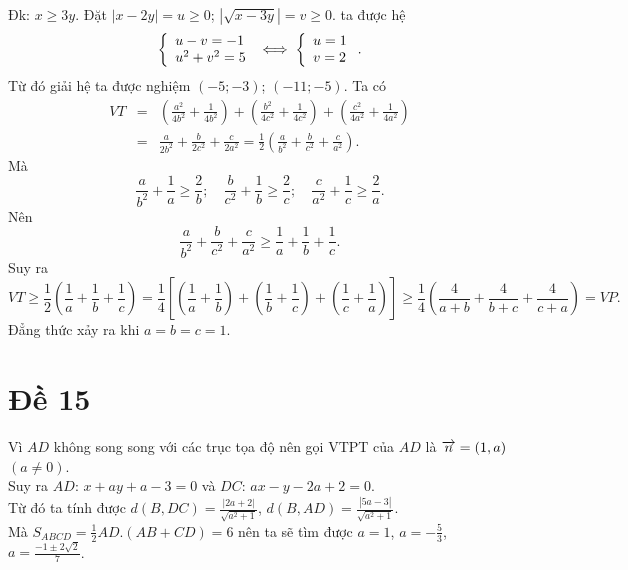 \hda 
Đk: $x\ge 3y$. Đặt $|x-2y|=u\ge 0$; $|\sqrt{x-3y}|=v\ge 0$. ta được hệ
$$ \left\{ \begin{array}{l} u-v=-1\\ u^2+v^2=5 \end{array}\right.\iff  \left\{ \begin{array}{l} u=1\\v=2 \end{array}\right.. $$
Từ đó giải hệ ta được nghiệm $(-5;-3)$; $(-11;-5)$.
\hda 
Ta có
\begin{eqnarray*}
VT&=&\left(\frac{a^2}{4b^2}+\frac 1{4b^2}\right)+\left(\frac{b^2}{4c^2}+\frac{1}{4c^2}\right)+\left(\frac{c^2}{4a^2}+\frac{1}{4a^2}\right)\\ 
&=&\frac{a}{2b^2}+\frac{b}{2c^2}+\frac{c}{2a^2}=\frac 12\left(\frac a{b^2}+\frac b{c^2}+\frac{c}{a^2}\right). 
\end{eqnarray*}
Mà
$$ \frac{a}{b^2}+\frac 1a\ge\frac 2b;\quad \frac{b}{c^2}+\frac 1b\ge \frac 2c;\quad \frac{c}{a^2}+\frac 1c\ge \frac 2a. $$
Nên
$$ \frac{a}{b^2}+\frac{b}{c^2}+\frac{c}{a^2}\ge \frac 1a+\frac 1b+\frac 1c. $$
Suy ra
$$ VT\ge \frac 12\left(\frac 1a+\frac 1b+\frac 1c\right)=\frac 14\left[\left(\frac 1a+\frac 1b\right)+\left(\frac 1b+\frac 1c\right)+\left(\frac 1c+\frac 1a\right)\right]\ge \frac 14\left( \frac 4{a+b}+\frac 4{b+c}+\frac 4{c+a}\right)=VP. $$
Đẳng thức xảy ra khi $a=b=c=1$.
\section{Đề 15}

\hda 
Vì $AD$ không song song với các trục tọa độ nên gọi VTPT của $AD$ là $\overrightarrow{n}=(1,a)$ $(a\neq 0)$.\\
Suy ra $AD$: $x+ay+a-3=0$ và $DC$: $ax-y-2a+2=0$.\\
Từ đó ta tính được $d(B,DC)=\frac{|2a+2|}{\sqrt{a^2+1}}$, $d(B,AD)=\frac{|5a-3|}{\sqrt{a^2+1}}$.\\
Mà $S_{ABCD}=\frac 12AD.(AB+CD)=6$ nên ta sẽ tìm được $a=1$, $a=-\frac 53$, $a=\frac{-1\pm2\sqrt 2}7$.

